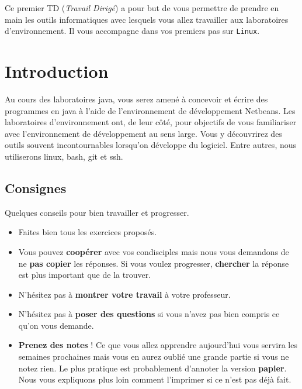 \documentclass[a4paper,11pt]{article}
\date{2018 -- 2019}
\begin{document}
\entete
\titre
{}
\lastedit


	\begin{tcolorbox}[blanker,
	before skip=10mm,after skip=10mm,
	borderline west={1mm}{-4mm}{lightgray},
	title=Objectifs, coltitle=black, fonttitle=\sffamily\bfseries\large]
	Ce premier TD (\textit{Travail Dirigé}) a pour but de vous permettre de prendre en main les outils informatiques 
	avec lesquels vous allez travailler aux laboratoires d'environnement. Il vous accompagne dans vos premiers pas sur \verb_Linux_.
	\end{tcolorbox}
	
	\tableofcontents

	\newpage

\section{Introduction}
Au cours des laboratoires java, vous serez amené à concevoir et écrire des programmes en java à l'aide de l'environnement de développement Netbeans.
Les laboratoires d'environnement ont, de leur côté, pour objectifs de vous familiariser avec l'environnement de développement au sens large. Vous y découvrirez des outils souvent incontournables lorsqu'on développe du logiciel. Entre autres, nous utiliserons linux, bash, git et ssh.
\subsection{Consignes}
Quelques conseils pour bien travailler et progresser.
\par
\begin{itemize}
\item Faites bien tous les exercices proposés.
\item Vous pouvez \textbf{coopérer} avec vos condisciples mais nous vous demandons de ne \textbf{pas copier} les réponses. Si vous voulez progresser, \textbf{chercher} la réponse est plus important que de la trouver. 
\item N'hésitez pas à \textbf{montrer votre travail} à votre professeur.
\item N'hésitez pas à \textbf{poser des questions} si vous n'avez pas bien compris ce qu'on vous demande.
\item \textbf{Prenez des notes} ! Ce que vous allez apprendre aujourd'hui vous servira les semaines prochaines mais vous en aurez oublié une grande partie si vous ne notez rien. Le plus pratique est probablement d'annoter la version \textbf{papier}. Nous vous expliquons plus loin comment l'imprimer si ce n'est pas déjà fait.
\end{itemize}
\end{document}
